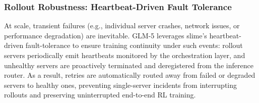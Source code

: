\subsubsection{Rollout Robustness: Heartbeat-Driven Fault Tolerance}

At scale, transient failures (e.g., individual server crashes, network issues, or performance degradation) are inevitable. GLM-5 leverages slime's heartbeat-driven fault-tolerance to ensure training continuity under such events: rollout servers periodically emit heartbeats monitored by the orchestration layer, and unhealthy servers are proactively terminated and deregistered from the inference router. As a result, retries are automatically routed away from failed or degraded servers to healthy ones, preventing single-server incidents from interrupting rollouts and preserving uninterrupted end-to-end RL training.
